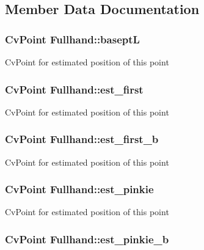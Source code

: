 \subsection{Member Data Documentation}
\hypertarget{classFullhand_af41f907b9a1a9db4c55ca8e79f0a7b02}{
\subsubsection[{baseptL}]{\setlength{\rightskip}{0pt plus 5cm}CvPoint {\bf Fullhand::baseptL}}}
\label{classFullhand_af41f907b9a1a9db4c55ca8e79f0a7b02}
CvPoint for estimated position of this point \hypertarget{classFullhand_a51e64566da2b001b0cbfecb9e0d05995}{
\subsubsection[{est\_\-first}]{\setlength{\rightskip}{0pt plus 5cm}CvPoint {\bf Fullhand::est\_\-first}}}
\label{classFullhand_a51e64566da2b001b0cbfecb9e0d05995}
CvPoint for estimated position of this point \hypertarget{classFullhand_acb06ed0b5a90fdb16e34af39604e2fc6}{
\subsubsection[{est\_\-first\_\-b}]{\setlength{\rightskip}{0pt plus 5cm}CvPoint {\bf Fullhand::est\_\-first\_\-b}}}
\label{classFullhand_acb06ed0b5a90fdb16e34af39604e2fc6}
CvPoint for estimated position of this point \hypertarget{classFullhand_aecd703ced5ced05be9330318b507075c}{
\subsubsection[{est\_\-pinkie}]{\setlength{\rightskip}{0pt plus 5cm}CvPoint {\bf Fullhand::est\_\-pinkie}}}
\label{classFullhand_aecd703ced5ced05be9330318b507075c}
CvPoint for estimated position of this point \hypertarget{classFullhand_a86105eb44b5dbb35dee539a9d7b0739a}{
\subsubsection[{est\_\-pinkie\_\-b}]{\setlength{\rightskip}{0pt plus 5cm}CvPoint {\bf Fullhand::est\_\-pinkie\_\-b}}}
